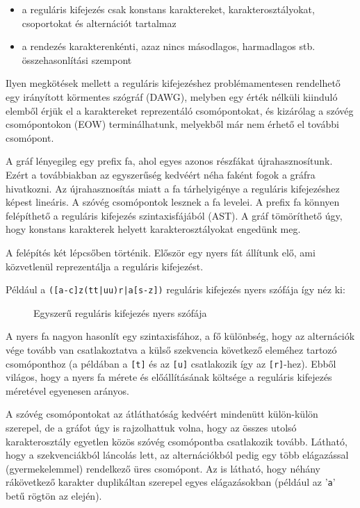 \documentclass[
    parspace,
    noindent,
    nohyp,
]{elteiktdk}[2023/04/10]
\begin{document}
\begin{itemize}
    \item a reguláris kifejezés csak konstans karaktereket, karakterosztályokat, csoportokat és alternációt tartalmaz
    \item a rendezés karakterenkénti, azaz nincs másodlagos, harmadlagos stb. összehasonlítási szempont
\end{itemize}

Ilyen megkötések mellett a reguláris kifejezéshez problémamentesen rendelhető egy
irányított körmentes szógráf (DAWG),
melyben egy érték nélküli kiinduló elemből érjük el a karaktereket reprezentáló csomópontokat,
és kizárólag a szóvég csomópontokon (EOW) terminálhatunk,
melyekből már nem érhető el további csomópont.

A gráf lényegileg egy prefix fa, ahol egyes azonos részfákat újrahasznosítunk.
Ezért a továbbiakban az egyszerűség kedvéért néha faként fogok a gráfra hivatkozni.
Az újrahasznosítás miatt a fa tárhelyigénye a reguláris kifejezéshez képest lineáris.
A szóvég csomópontok lesznek a fa levelei.
A prefix fa könnyen felépíthető a reguláris kifejezés szintaxisfájából (AST).
A gráf tömöríthető úgy, hogy konstans karakterek helyett karakterosztályokat engedünk meg.

A felépítés két lépcsőben történik.
Először egy nyers fát állítunk elő, ami közvetlenül reprezentálja a reguláris kifejezést.



Például a \texttt{([a-c]z(tt|uu)r|a[s-z])} reguláris kifejezés nyers szófája így néz ki:

\begin{figure}[H]
\centering

\caption{Egyszerű reguláris kifejezés nyers szófája}
\end{figure}

A nyers fa nagyon hasonlít egy szintaxisfához,
a fő különbség, hogy az alternációk vége tovább van csatlakoztatva a külső szekvencia
következő eleméhez tartozó csomóponthoz
(a példában a \texttt{[t]} és az \texttt{[u]} csatlakozik így az \texttt{[r]}-hez).
Ebből világos, hogy a nyers fa mérete és előállításának költsége
a reguláris kifejezés méretével egyenesen arányos.

A szóvég csomópontokat az átláthatóság kedvéért mindenütt külön-külön szerepel,
de a gráfot úgy is rajzolhattuk volna,
hogy az összes utolsó karakterosztály egyetlen közös szóvég csomópontba csatlakozik tovább.
Látható, hogy a szekvenciákból láncolás lett,
az alternációkból pedig egy több elágazással (gyermekelemmel) rendelkező üres csomópont.
Az is látható, hogy néhány rákövetkező karakter duplikáltan szerepel egyes elágazásokban
(például az '\texttt{a}' betű rögtön az elején).
\end{document}
